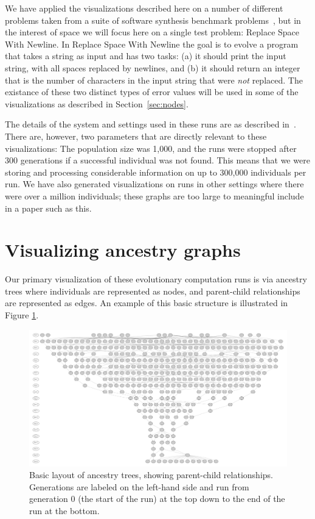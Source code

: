 \documentclass{sig-alternate}
\begin{document}
We have applied the visualizations described here on a 
number of different problems taken from a suite of software synthesis benchmark 
problems~\cite{Helmuth:2015:GECCO}, but in the interest of space we
will focus here on a single test problem: Replace Space With Newline.
In Replace Space With Newline the goal is to evolve a program that takes a string
as input and has two tasks: (a) it should print the input string, with all spaces
replaced by newlines, and (b) it should return an integer that is the number of
characters in the input string that were \emph{not} replaced. The existance of
these two distinct types of error values will be used in some of the visualizations
as described in Section~\ref{sec:nodes}. 

The details of the system and settings used in these runs are as described 
in~\cite{Helmuth:2015:GECCO}. There are, however, two parameters that are 
directly relevant to these visualizations: The population size was 1,000, and the runs were stopped after 300 generations if a successful individual was not 
found. This means that we were storing and processing considerable information
on up to 300,000 individuals per run. We have also generated visualizations on runs
in other settings where there were over a million individuals; these graphs are too
large to meaningful include in a paper such as this.

\section{Visualizing ancestry graphs}
\label{sec:basics}

Our primary visualization of these evolutionary computation runs is via ancestry trees
where individuals are represented as nodes, and parent-child relationships are 
represented as edges. An example of this basic structure is illustrated in 
Figure \ref{fig:lexRun0Basic}. 

\begin{figure}
	\begin{center}
		\includegraphics[width=\linewidth]{../Figures/run0_basic_structure.pdf}
	\end{center}
	\caption{Basic layout of ancestry trees, showing parent-child relationships. Generations are labeled on the left-hand side and run from generation 0 (the start of the run) at the top down to the end of the run at the bottom.}
	\label{fig:lexRun0Basic}
\end{figure}
\end{document}
